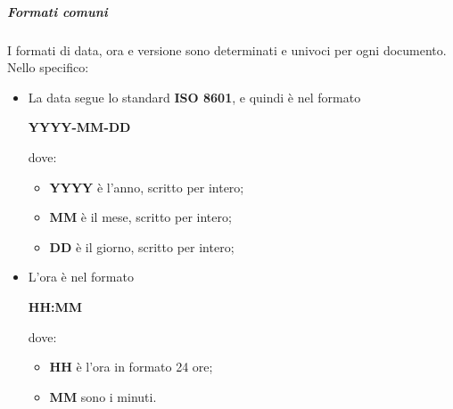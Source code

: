 \documentclass[../norme-di-progetto.tex]{subfiles}
\begin{document}
\subparagraph*{Formati comuni}
I formati di data, ora e versione sono determinati e univoci per ogni documento. Nello specifico:
\begin{itemize}
  \item La data segue lo standard \textbf{ISO 8601}, e quindi è nel formato \\ \begin{center}
    \centering
    \textbf{YYYY-MM-DD}
  \end{center} dove:
  \begin{itemize}
    \item \textbf{YYYY} è l'anno, scritto per intero;
    \item \textbf{MM} è il mese, scritto per intero;
    \item \textbf{DD} è il giorno, scritto per intero;
  \end{itemize}
  \item L'ora è nel formato \\ \begin{center}
  \centering
  \textbf{HH:MM}
  \end{center} dove:
  \begin{itemize}
    \item \textbf{HH} è l'ora in formato 24 ore;
    \item \textbf{MM} sono i minuti.
  \end{itemize}
\end{itemize}
\end{document}
